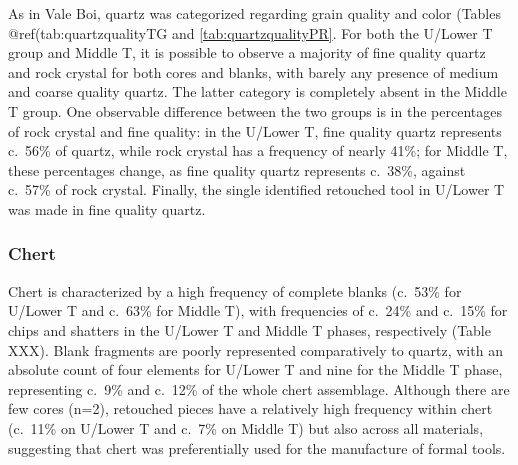 \documentclass[12pt,twoside]{reedthesis}
\begin{document}
As in Vale Boi, quartz was categorized regarding grain quality and color (Tables @ref(tab:quartzqualityTG and \ref{tab:quartzqualityPR}. For both the U/Lower T group and Middle T, it is possible to observe a majority of fine quality quartz and rock crystal for both cores and blanks, with barely any presence of medium and coarse quality quartz. The latter category is completely absent in the Middle T group. One observable difference between the two groups is in the percentages of rock crystal and fine quality: in the U/Lower T, fine quality quartz represents c.~56\% of quartz, while rock crystal has a frequency of nearly 41\%; for Middle T, these percentages change, as fine quality quartz represents c.~38\%, against c.~57\% of rock crystal. Finally, the single identified retouched tool in U/Lower T was made in fine quality quartz.
\begin{table}

\caption{\label{tab:quartzqualityPR}Lapa do Picareiro - Middle T. Frequencies of technological classes by quartz quality.}
\centering
{}
\end{table}
\hypertarget{chert-1}{%
\subsubsection{Chert}\label{chert-1}}

Chert is characterized by a high frequency of complete blanks (c.~53\% for U/Lower T and c.~63\% for Middle T), with frequencies of c.~24\% and c.~15\% for chips and shatters in the U/Lower T and Middle T phases, respectively (Table XXX). Blank fragments are poorly represented comparatively to quartz, with an absolute count of four elements for U/Lower T and nine for the Middle T phase, representing c.~9\% and c.~12\% of the whole chert assemblage. Although there are few cores (n=2), retouched pieces have a relatively high frequency within chert (c.~11\% on U/Lower T and c.~7\% on Middle T) but also across all materials, suggesting that chert was preferentially used for the manufacture of formal tools.
\end{document}
